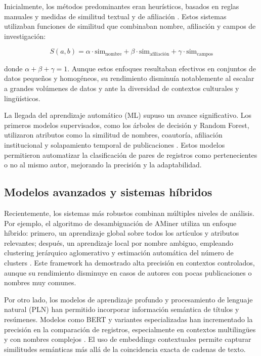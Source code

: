 \documentclass{article}
\begin{document}
Inicialmente, los métodos predominantes eran heurísticos, basados en reglas manuales y medidas de similitud textual y de afiliación \cite{Ferreira2012}. Estos sistemas utilizaban funciones de similitud que combinaban nombre, afiliación y campos de investigación:

\begin{equation}
S(a,b) = \alpha \cdot \text{sim}_{\text{nombre}} + \beta \cdot \text{sim}_{\text{afiliación}} + \gamma \cdot \text{sim}_{\text{campos}}
\end{equation}

donde $\alpha + \beta + \gamma = 1$. Aunque estos enfoques resultaban efectivos en conjuntos de datos pequeños y homogéneos, su rendimiento disminuía notablemente al escalar a grandes volúmenes de datos y ante la diversidad de contextos culturales y lingüísticos.

La llegada del aprendizaje automático (ML) supuso un avance significativo. Los primeros modelos supervisados, como los árboles de decisión y Random Forest, utilizaron atributos como la similitud de nombres, coautoría, afiliación institucional y solapamiento temporal de publicaciones \cite{Canteros2020, Wang2020}. Estos modelos permitieron automatizar la clasificación de pares de registros como pertenecientes o no al mismo autor, mejorando la precisión y la adaptabilidad.

\subsection{Modelos avanzados y sistemas híbridos}

Recientemente, los sistemas más robustos combinan múltiples niveles de análisis. Por ejemplo, el algoritmo de desambiguación de AMiner utiliza un enfoque híbrido: primero, un aprendizaje global sobre todos los artículos y atributos relevantes; después, un aprendizaje local por nombre ambiguo, empleando clustering jerárquico aglomerativo y estimación automática del número de clusters \cite{Canteros2020}. Este framework ha demostrado alta precisión en contextos controlados, aunque su rendimiento disminuye en casos de autores con pocas publicaciones o nombres muy comunes.

Por otro lado, los modelos de aprendizaje profundo y procesamiento de lenguaje natural (PLN) han permitido incorporar información semántica de títulos y resúmenes. Modelos como BERT y variantes especializadas han incrementado la precisión en la comparación de registros, especialmente en contextos multilingües y con nombres complejos \cite{Zhu2018, NameBERT2024}. El uso de embeddings contextuales permite capturar similitudes semánticas más allá de la coincidencia exacta de cadenas de texto.
\end{document}
